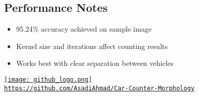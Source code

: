 \documentclass[12pt]{article}
\begin{document}
\subsection{Performance Notes}
\begin{itemize}
    \item 95.24\% accuracy achieved on sample image
    \item Kernel size and iterations affect counting results
    \item Works best with clear separation between vehicles
\end{itemize}

\begin{center}
    \href{https://github.com/AsadiAhmad/Car-Counter-Morphology}{
        \texttt{[image: github\_logo.png]} \\
        \texttt{https://github.com/AsadiAhmad/Car-Counter-Morphology}
    }
\end{center}
\end{document}
